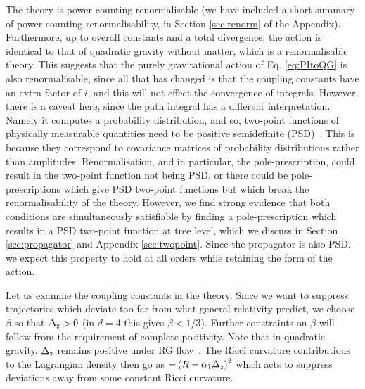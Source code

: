 \documentclass[aps,preprintnumbers,superscriptaddress,longbibliography]{revtex4-1}
\def\R2Term{\Delta_{\text{\tiny 2}}}
\begin{document}
The theory is power-counting renormalisable (we have included a short summary of power counting renormalisability, in Section \ref{sec:renorm} of the Appendix). Furthermore, up to overall constants and a total divergence, the action is identical to that of quadratic gravity without matter,  which is a renormalisable theory. This suggests that the purely gravitational action of Eq. \eqref{eq:PItoQG} is also renormalisable, since all that has changed is that the coupling constants have an extra factor of $i$, and this will not effect the convergence of integrals. However, there is a caveat here, since the path integral has a different interpretation. Namely it computes a probability distribution, and so, two-point functions of physically measurable quantities need to be positive semidefinite (PSD)~\cite{risken1996fokker,gardiner2004handbook}. This is because they correspond to covariance matrices of probability distributions rather than amplitudes. Renormalisation, and in particular, the pole-prescription, could result in the two-point function not being PSD, or there could be pole-prescriptions which give PSD two-point functions but which break the renormalisability of the theory.  However, we find strong evidence that both conditions are simultaneously satisfiable by finding a pole-prescription which results in a PSD two-point function at tree level, which we discuss in Section \ref{sec:propagator} and Appendix \ref{sec:twopoint}. Since the propagator is also PSD, we expect this property to hold at all orders while retaining the form of the action. 

Let us examine the coupling constants in the theory. Since we want to suppress trajectories which deviate too far from what general relativity predict, we choose $\beta$ so that $\R2Term > 0$ (in $d=4$ this gives $\beta<1/3$).  Further constraints on $\beta$ will follow from the requirement of complete positivity. Note that in quadratic gravity, $\R2Term$ remains positive under RG flow~\cite{julve19781978quantum,
fradkin1981renormalizable,
benedetti2009asymtotic,buccio2024physical}. The Ricci curvature contributions to the Lagrangian density then go as 
$-\left(R-\alpha_1\R2Term\right)^2$ 
which acts to suppress deviations away from some constant Ricci curvature. 
\end{document}
